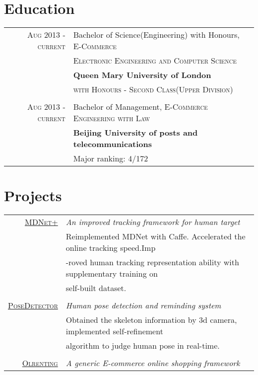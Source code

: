 \documentclass[a4paper,10pt]{article}
\begin{document}
\section{Education}
\begin{tabular}{rl}	


 \textsc{Aug 2013} - \textsc{current} & Bachelor of Science(Engineering) with Honours, \textsc{E-Commerce}\\
&\textsc{Electronic Engineering and} \textsc{Computer Science}\\
& \textbf{Queen Mary University of London}\\
& \textsc{with Honours - Second Class(Upper Division)}  \\
\\

 \textsc{Aug 2013} - \textsc{current} & Bachelor of Management, \textsc{E-Commerce Engineering with Law}\\
& \textbf{Beijing University of posts and telecommunications}\\
& Major ranking: \textsc{4/172}  \\

\end{tabular}

\section{Projects}
\begin{tabular}{rl}	
 \textsc{\href{https://github.com/rao1219/MDNet}{MDNet+}} & \emph{An improved tracking framework for human target}\\
& Reimplemented MDNet with Caffe. Accelerated the online tracking speed.Imp\\
& -roved human tracking representation ability with supplementary training on\\
& self-built dataset.\\
\\

 \textsc{\href{https://github.com/rao1219/intel_cup-3Dcamera}{PoseDetector}} & \emph{Human pose detection and reminding system}\\
& Obtained the skeleton information by 3d camera, implemented self-refinement \\
& algorithm to judge human pose in real-time.\\ 
\\
 \textsc{\href{https://github.com/rao1219/olhandicrafts}{Olrenting}} & \emph{A generic E-commerce online shopping framework}\\
\end{tabular}





\end{document}
